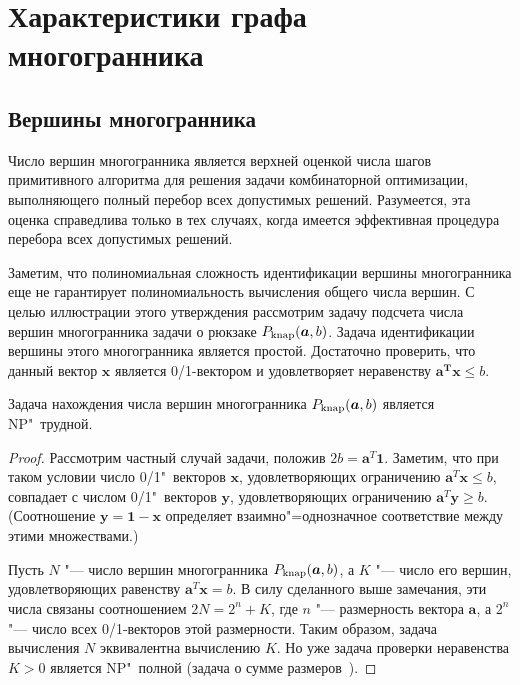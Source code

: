 %
%

\section{Характеристики графа многогранника}
\label{sec:PolyhedralGraph}

\subsection{Вершины многогранника}

Число вершин многогранника является верхней оценкой числа шагов примитивного алгоритма для решения задачи комбинаторной оптимизации, выполняющего полный перебор всех допустимых решений.
Разумеется, эта оценка справедлива только в тех случаях, когда имеется эффективная процедура перебора всех допустимых решений. 

Заметим, что полиномиальная сложность идентификации вершины многогранника еще не гарантирует полиномиальность вычисления общего числа вершин.
С целью иллюстрации этого утверждения рассмотрим задачу подсчета числа вершин многогранника задачи о рюкзаке $P_{\textup{knap}}(\bm{a}, b)$.
Задача идентификации вершины этого многогранника является простой. Достаточно проверить, что данный вектор $\bm{x}$ является 0/1-вектором и удовлетворяет неравенству $\bm{a^T} \bm{x} \le b$.

\begin{prop}
	Задача нахождения числа вершин многогранника $P_{\textup{knap}}(\bm{a}, b)$ является NP"~трудной.
\end{prop}
\begin{proof}
Рассмотрим частный случай задачи, положив $2b = \bm{a}^T \bm{1}$.
Заметим, что при таком условии число 0/1"~векторов $\bm{x}$,
удовлетворяющих ограничению $\bm{a}^T \bm{x} \le b$, 
совпадает с числом 0/1"~векторов $\bm{y}$, удовлетворяющих ограничению $\bm{a}^T \bm{y} \ge b$.
(Соотношение $\bm{y} = \bm{1} - \bm{x}$ определяет взаимно"=однозначное соответствие между этими множествами.)

Пусть $N$ "--- число вершин многогранника $P_{\textup{knap}}(\bm{a}, b)$,
а $K$ "--- число его вершин, удовлетворяющих равенству $\bm{a}^T \bm{x} = b$.
В силу сделанного выше замечания, эти числа связаны соотношением $2 N = 2^n + K$, где $n$ "--- размерность вектора $\bm{a}$, а $2^n$ "--- число всех 0/1-векторов этой размерности.
Таким образом, задача вычисления $N$ эквивалентна вычислению $K$.
Но уже задача проверки неравенства $K > 0$ является NP"~полной (задача о сумме размеров~\cite{Garey:1982}).
\end{proof}

